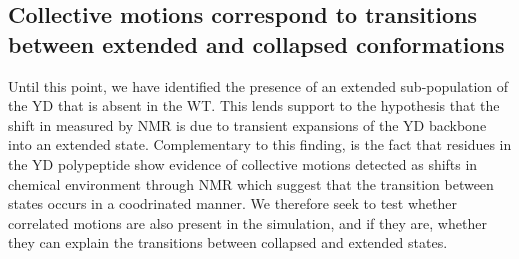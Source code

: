 \begin{figure}
\centering     %
{}
\end{figure}

\subsection{Collective motions correspond to transitions between extended and collapsed conformations}

Until this point, we have identified the presence of an extended sub-population of the YD \gct that is absent in the WT. This lends support to the hypothesis that the shift in \diffusion measured by NMR is due to transient expansions of the YD backbone into an extended state. Complementary to this finding, is the fact that residues in the YD polypeptide show evidence of collective motions detected as shifts in chemical environment through NMR  which suggest that the transition between states occurs in a coodrinated manner. We therefore seek to test whether correlated motions are also present in the simulation, and if they are, whether they can explain the transitions between collapsed and extended states.

